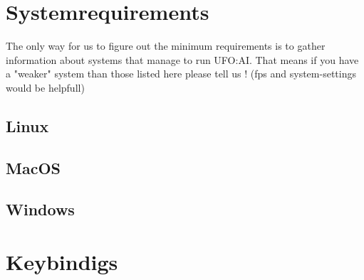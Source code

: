 
%
%


\section{Systemrequirements}
The only way for us to figure out the minimum requirements is to gather information about systems that manage to run UFO:AI. That means if you have a "weaker" system than those listed here please tell us ! (fps and system-settings would be helpfull)
\subsection{Linux}
\subsection{MacOS}
\subsection{Windows}

\section{Keybindigs}
